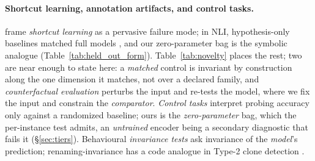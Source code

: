 \paragraph{Shortcut learning, annotation artifacts, and control tasks.} \citet{geirhos2020shortcut} frame \emph{shortcut learning} as a pervasive failure mode; in NLI, hypothesis-only baselines matched full models \citep{gururangan2018annotation, poliak2018hypothesis}, and our zero-parameter bag is the symbolic analogue (Table~\ref{tab:held_out_form}). Table~\ref{tab:novelty} places the rest; two are near enough to state here: a \emph{matched} control \citep{elazar_amnesic_2021} is invariant by construction along the one dimension it matches, not over a declared family, and \emph{counterfactual evaluation} \citep[contrast sets;][]{gardner_evaluating_2020} perturbs the input and re-tests the model, where we fix the input and constrain the \emph{comparator}. \emph{Control tasks} \citep{hewitt2019control} interpret probing accuracy only against a randomized baseline; ours is the \emph{zero-parameter} bag, which the per-instance test admits, an \emph{untrained} encoder being a secondary diagnostic that fails it (\S\ref{sec:tiers}). Behavioural \emph{invariance tests} \citep{ribeiro2020beyond} ask invariance of the \emph{model}'s prediction; renaming-invariance has a code analogue in Type-2 clone detection \citep{svajlenko2014towards, zhang2019novel, wang2020detecting}.

